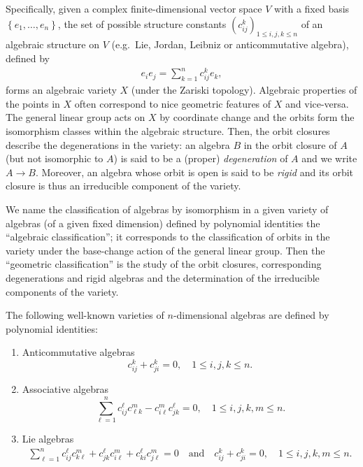 \documentclass{commat}
\newcommand{\pb}[1]{\left\{ #1\right\}}
\newcommand{\seq}[1]{\left( #1\right)}
\begin{document}
Specifically, given a complex finite-dimensional vector space $V$ with a fixed basis $\pb{e_{1},\ldots ,e_{n}}$, the set of possible structure constants $\seq{c_{ij}^k}_{1\leq i,j,k\leq n}$ of an algebraic structure on $V$ (e.g.\ Lie, Jordan, Leibniz or anticommutative algebra), defined by
\begin{align*}
	e_i e_j=\sum_{k=1}^n c_{ij}^k e_k,
\end{align*}
forms an algebraic variety $X$ (under the Zariski topology). Algebraic properties of the points in $X$ often correspond to nice geometric features of $X$ and vice-versa. The general linear group acts on $X$ by coordinate change and the orbits form the isomorphism classes within the algebraic structure. Then, the orbit closures describe the degenerations in the variety: an algebra $B$ in the orbit closure of $A$ (but not isomorphic to $A$) is said to be a (proper) \textit{degeneration} of $A$ and we write $A\to B$. Moreover, an algebra whose orbit is open is said to be \textit{rigid} and its orbit closure is thus an irreducible component of the variety.


We name the classification of algebras by isomorphism in a given variety of algebras (of a given fixed dimension) defined by polynomial identities the ``algebraic classification''; it corresponds to the classification of orbits in the variety under the base-change action of the general linear group. Then the ``geometric classification'' is the study of the orbit closures, corresponding degenerations and rigid algebras and the determination of the irreducible components of the variety.

\begin{example}
	The following well-known varieties of $n$-dimensional algebras are defined by polynomial identities: 
	\begin{enumerate}
		\item Anticommutative algebras
		\begin{equation*}
			c_{ij}^k+c_{ji}^k=0, \quad 1\leq i, j, k\leq n.
		\end{equation*}
		\item Associative algebras
		\begin{equation*}
			\sum_{\ell=1}^n c_{ij}^\ell c_{\ell k}^m- c_{i\ell}^m c_{j k}^\ell=0, \quad 1\leq i, j, k, m\leq n.
		\end{equation*}
		
		\item Lie algebras
		\begin{align*}
			\sum_{\ell=1}^n c_{ij}^\ell c_{k\ell}^m+ c_{jk}^\ell c_{i\ell}^m+c_{ki}^\ell c_{j \ell}^m=0 \quad\mbox{and}\quad c_{ij}^k+c_{ji}^k=0, \quad 1\leq i, j, k, m\leq n.
		\end{align*}
	\end{enumerate}
\end{example}
\end{document}
